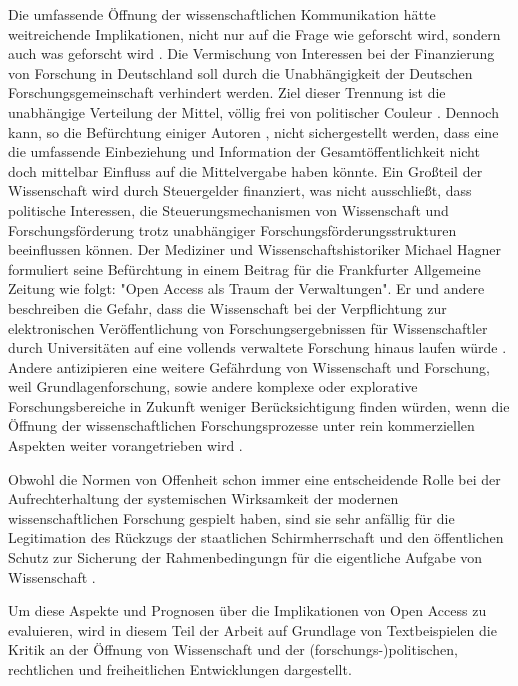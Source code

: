 Die umfassende Öffnung der wissenschaftlichen Kommunikation hätte weitreichende Implikationen, nicht nur auf die Frage wie geforscht wird, sondern auch was geforscht wird \cite{suchen}. Die Vermischung von Interessen bei der Finanzierung von Forschung in Deutschland soll durch die Unabhängigkeit der Deutschen Forschungsgemeinschaft verhindert werden. Ziel dieser Trennung ist die unabhängige Verteilung der Mittel, völlig frei von politischer Couleur \cite{suchen}. Dennoch kann, so die Befürchtung einiger Autoren \cite{suchen}, nicht sichergestellt werden, dass eine die umfassende Einbeziehung und Information der Gesamtöffentlichkeit nicht doch mittelbar Einfluss auf die Mittelvergabe haben könnte. Ein Großteil der Wissenschaft wird durch Steuergelder finanziert, was nicht ausschließt, dass politische Interessen, die Steuerungsmechanismen von Wissenschaft und Forschungsförderung trotz unabhängiger Forschungsförderungsstrukturen beeinflussen können. Der Mediziner und Wissenschaftshistoriker Michael Hagner formuliert seine Befürchtung in einem Beitrag für die Frankfurter Allgemeine Zeitung wie folgt: "Open Access als Traum der Verwaltungen". Er und andere beschreiben die Gefahr, dass die Wissenschaft bei der Verpflichtung zur elektronischen Veröffentlichung von Forschungsergebnissen für Wissenschaftler durch Universitäten auf eine vollends verwaltete Forschung hinaus laufen würde \cite{hagner_faz_2009}. Andere antizipieren eine weitere Gefährdung von Wissenschaft und Forschung, weil Grundlagenforschung, sowie andere komplexe oder explorative Forschungsbereiche in Zukunft weniger Berücksichtigung finden würden, wenn die Öffnung der wissenschaftlichen Forschungsprozesse unter rein kommerziellen Aspekten weiter vorangetrieben wird \cite{suchen}.

Obwohl die Normen von Offenheit schon immer eine entscheidende Rolle bei der Aufrechterhaltung der systemischen Wirksamkeit der modernen wissenschaftlichen Forschung gespielt haben, sind sie sehr anfällig für die Legitimation des Rückzugs der staatlichen Schirmherrschaft und den öffentlichen Schutz zur Sicherung der Rahmenbedingungn für die eigentliche Aufgabe von Wissenschaft \cite{david1998_common}.

Um diese Aspekte und Prognosen über die Implikationen von Open Access zu evaluieren, wird in diesem Teil der Arbeit auf Grundlage von Textbeispielen die Kritik an der Öffnung von Wissenschaft und der (forschungs-)politischen, rechtlichen und freiheitlichen Entwicklungen dargestellt.

